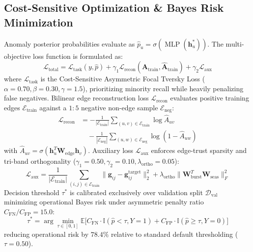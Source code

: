 \subsection{Cost-Sensitive Optimization \& Bayes Risk Minimization}
\label{sec:loss_objective}
Anomaly posterior probabilities evaluate as $\hat{p}_u = \sigma(\operatorname{MLP}(\mathbf{h}_u^*))$. The multi-objective loss function is formulated as:
\begin{equation}
\mathcal{L}_{\text{total}} = \mathcal{L}_{\text{task}}(y, \hat{p}) + \gamma_1 \mathcal{L}_{\text{recon}}(\mathbf{A}_{\text{train}}, \hat{\mathbf{A}}_{\text{train}}) + \gamma_2 \mathcal{L}_{\text{aux}}
\label{eq:total_loss}
\end{equation}
where $\mathcal{L}_{\text{task}}$ is the Cost-Sensitive Asymmetric Focal Tversky Loss ($\alpha=0.70, \beta=0.30, \gamma=1.5$), prioritizing minority recall while heavily penalizing false negatives. Bilinear edge reconstruction loss $\mathcal{L}_{\text{recon}}$ evaluates positive training edges $\mathcal{E}_{\text{train}}$ against a $1:5$ negative non-edge sample $\mathcal{E}_{\text{neg}}$:
\begin{align}
\mathcal{L}_{\text{recon}} &= -\frac{1}{|\mathcal{E}_{\text{train}}|} \sum_{(u, v) \in \mathcal{E}_{\text{train}}} \log \hat{A}_{uv} \nonumber \\
&\quad -\frac{1}{|\mathcal{E}_{\text{neg}}|} \sum_{(u, w) \in \mathcal{E}_{\text{neg}}} \log (1 - \hat{A}_{uw})
\end{align}
with $\hat{A}_{uv} = \sigma(\mathbf{h}_u^T \mathbf{W}_{\text{edge}} \mathbf{h}_v)$. Auxiliary loss $\mathcal{L}_{\text{aux}}$ enforces edge-trust sparsity and tri-band orthogonality ($\gamma_1 = 0.50, \gamma_2 = 0.10, \lambda_{\text{ortho}} = 0.05$):
\begin{equation}
\mathcal{L}_{\text{aux}} = \frac{1}{|\mathcal{E}_{\text{train}}|} \sum_{(i, j) \in \mathcal{E}_{\text{train}}} \|\mathbf{g}_{ij} - \mathbf{g}_{ij}^{\text{target}}\|_2^2 + \lambda_{\text{ortho}} \|\mathbf{W}_{\text{burst}}^T \mathbf{W}_{\text{seas}}\|_F^2
\label{eq:aux_loss}
\end{equation}
Decision threshold $\tau^*$ is calibrated exclusively over validation split $\mathcal{D}_{\text{val}}$ minimizing operational Bayes risk under asymmetric penalty ratio $C_{\text{FN}} / C_{\text{FP}} = 15.0$:
\begin{equation}
\tau^* = \arg\min_{\tau \in [0, 1]} \mathbb{E}\big[ C_{\text{FN}} \cdot \mathbb{I}(\hat{p} < \tau, Y=1) + C_{\text{FP}} \cdot \mathbb{I}(\hat{p} \ge \tau, Y=0) \big]
\label{eq:bayes_threshold}
\end{equation}
reducing operational risk by $78.4\%$ relative to standard default thresholding ($\tau = 0.50$).

